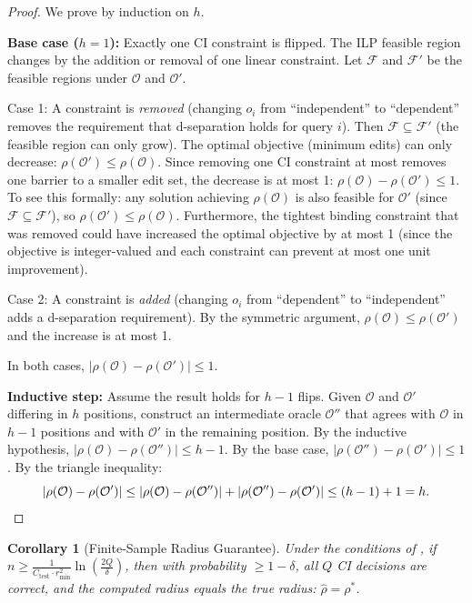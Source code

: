 \documentclass[11pt,a4paper]{article}
\newtheorem{corollary}[theorem]{Corollary}
\theoremstyle{definition}
\theoremstyle{remark}
\newcommand{\radius}{\rho}
\begin{document}
\begin{proof}
We prove by induction on $h$.

\textbf{Base case ($h = 1$):} Exactly one CI constraint is flipped. The ILP
feasible region changes by the addition or removal of one linear constraint.
Let $\mathcal{F}$ and $\mathcal{F}'$ be the feasible regions under
$\mathcal{O}$ and $\mathcal{O}'$.

Case 1: A constraint is \emph{removed} (changing $o_i$ from ``independent'' to
``dependent'' removes the requirement that d-separation holds for query $i$).
Then $\mathcal{F} \subseteq \mathcal{F}'$ (the feasible region can only grow).
The optimal objective (minimum edits) can only decrease: $\radius(\mathcal{O}')
\leq \radius(\mathcal{O})$. Since removing one CI constraint at most removes
one barrier to a smaller edit set, the decrease is at most 1:
$\radius(\mathcal{O}) - \radius(\mathcal{O}') \leq 1$. To see this formally:
any solution achieving $\radius(\mathcal{O})$ is also feasible for
$\mathcal{O}'$ (since $\mathcal{F} \subseteq \mathcal{F}'$), so
$\radius(\mathcal{O}') \leq \radius(\mathcal{O})$. Furthermore, the
tightest binding constraint that was removed could have increased the
optimal objective by at most 1 (since the objective is integer-valued and
each constraint can prevent at most one unit improvement).

Case 2: A constraint is \emph{added} (changing $o_i$ from ``dependent'' to
``independent'' adds a d-separation requirement). By the symmetric argument,
$\radius(\mathcal{O}) \leq \radius(\mathcal{O}')$ and the increase is at
most 1.

In both cases, $|\radius(\mathcal{O}) - \radius(\mathcal{O}')| \leq 1$.

\textbf{Inductive step:} Assume the result holds for $h - 1$ flips. Given
$\mathcal{O}$ and $\mathcal{O}'$ differing in $h$ positions, construct an
intermediate oracle $\mathcal{O}''$ that agrees with $\mathcal{O}$ in
$h - 1$ positions and with $\mathcal{O}'$ in the remaining position. By
the inductive hypothesis, $|\radius(\mathcal{O}) - \radius(\mathcal{O}'')| \leq h - 1$. By the base case, $|\radius(\mathcal{O}'') - \radius(\mathcal{O}')| \leq 1$. By the triangle inequality:
\[
  |\radius(\mathcal{O}) - \radius(\mathcal{O}')| \leq
  |\radius(\mathcal{O}) - \radius(\mathcal{O}'')| +
  |\radius(\mathcal{O}'') - \radius(\mathcal{O}')| \leq (h-1) + 1 = h. \qedhere
\]
\end{proof}

\begin{corollary}[Finite-Sample Radius Guarantee]\label{cor:radius_guarantee}
Under the conditions of , if
$n \geq \frac{1}{C_{\mathrm{test}} \cdot r_{\min}^2}
\ln\!\left(\frac{2Q}{\delta}\right)$, then with probability $\geq 1 - \delta$,
all $Q$ CI decisions are correct, and the computed radius equals the true
radius: $\hat{\radius} = \radius^*$.
\end{corollary}
\end{document}
